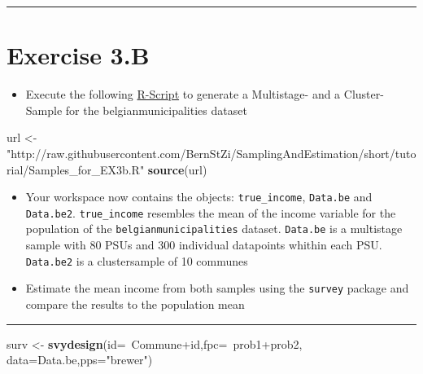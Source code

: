 \documentclass[]{article}
\newenvironment{Shaded}{\begin{snugshade}}{\end{snugshade}}
\newcommand{\KeywordTok}[1]{\textcolor[rgb]{0.13,0.29,0.53}{\textbf{{#1}}}}
\newcommand{\DataTypeTok}[1]{\textcolor[rgb]{0.13,0.29,0.53}{{#1}}}
\newcommand{\StringTok}[1]{\textcolor[rgb]{0.31,0.60,0.02}{{#1}}}
\newcommand{\NormalTok}[1]{{#1}}
\begin{document}
\begin{center}\rule{0.5\linewidth}{\linethickness}\end{center}

\section{Exercise 3.B}\label{exercise-3.b}

\begin{itemize}
\itemsep1pt\parskip0pt
\item
  Execute the following
  \href{https://raw.githubusercontent.com/BernStZi/SamplingAndEstimation/short/tutorial/Samples_for_EX3b.R}{R-Script}
  to generate a Multistage- and a Cluster- Sample for the
  belgianmunicipalities dataset
\end{itemize}

\begin{Shaded}
\begin{Highlighting}[]
\NormalTok{url <-}\StringTok{ "http://raw.githubusercontent.com/BernStZi/SamplingAndEstimation/short/tutorial/Samples_for_EX3b.R"}
\KeywordTok{source}\NormalTok{(url)}
\end{Highlighting}
\end{Shaded}

\begin{itemize}
\itemsep1pt\parskip0pt
\item
  Your workspace now contains the objects: \texttt{true\_income},
  \texttt{Data.be} and \texttt{Data.be2}. \texttt{true\_income}
  resembles the mean of the income variable for the population of the
  \texttt{belgianmunicipalities} dataset. \texttt{Data.be} is a
  multistage sample with 80 PSUs and 300 individual datapoints whithin
  each PSU. \texttt{Data.be2} is a clustersample of 10 communes
\item
  Estimate the mean income from both samples using the \texttt{survey}
  package and compare the results to the population mean
\end{itemize}

\begin{center}\rule{0.5\linewidth}{\linethickness}\end{center}

\begin{Shaded}
\begin{Highlighting}[]
\NormalTok{surv <-}\StringTok{ }\KeywordTok{svydesign}\NormalTok{(}\DataTypeTok{id=}\NormalTok{~Commune+id,}\DataTypeTok{fpc=}\NormalTok{~prob1+prob2, }
                  \DataTypeTok{data=}\NormalTok{Data.be,}\DataTypeTok{pps=}\StringTok{"brewer"}\NormalTok{)}
\end{Highlighting}
\end{Shaded}
\end{document}
